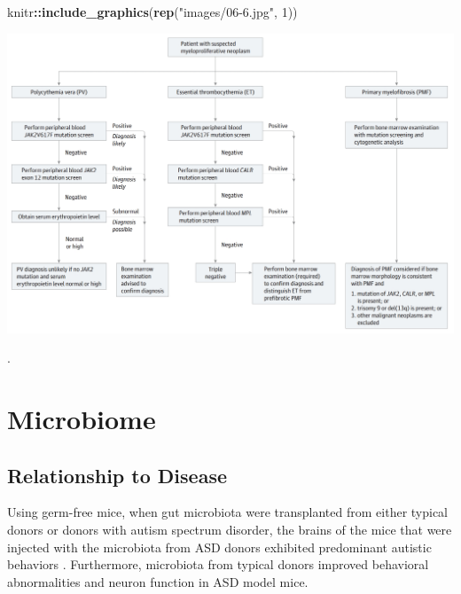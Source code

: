 \documentclass[]{book}
\newenvironment{Shaded}{\begin{snugshade}}{\end{snugshade}}
\newcommand{\KeywordTok}[1]{\textcolor[rgb]{0.13,0.29,0.53}{\textbf{#1}}}
\newcommand{\DataTypeTok}[1]{\textcolor[rgb]{0.13,0.29,0.53}{#1}}
\newcommand{\DecValTok}[1]{\textcolor[rgb]{0.00,0.00,0.81}{#1}}
\newcommand{\StringTok}[1]{\textcolor[rgb]{0.31,0.60,0.02}{#1}}
\newcommand{\OtherTok}[1]{\textcolor[rgb]{0.56,0.35,0.01}{#1}}
\newcommand{\OperatorTok}[1]{\textcolor[rgb]{0.81,0.36,0.00}{\textbf{#1}}}
\newcommand{\NormalTok}[1]{#1}
\begin{document}
\begin{Shaded}
\begin{Highlighting}[]
\NormalTok{knitr}\OperatorTok{::}\KeywordTok{include_graphics}\NormalTok{(}\KeywordTok{rep}\NormalTok{(}\StringTok{"images/06-6.jpg"}\NormalTok{, }\DecValTok{1}\NormalTok{))          }
\end{Highlighting}
\end{Shaded}

\includegraphics{images/06-6.jpg}

\begin{Shaded}
\end{Shaded}

\citep{tefferi2015myeloproliferative}.

\chapter{Microbiome}\label{microbiome}

\section{Relationship to Disease}\label{relationship-to-disease}

Using germ-free mice, when gut microbiota were transplanted from either
typical donors or donors with autism spectrum disorder, the brains of
the mice that were injected with the microbiota from ASD donors
exhibited predominant autistic behaviors \citep{sharon2019human}.
Furthermore, microbiota from typical donors improved behavioral
abnormalities and neuron function in ASD model mice.
\end{document}
